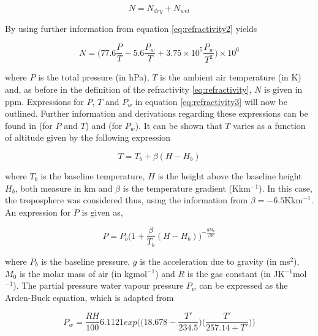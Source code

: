 \documentclass{article}
\begin{document}
\begin{equation}
N = N_{dry} + N_{wet}
\label{eq:refractivity2}
\end{equation}

\vspace{2mm}
\noindent
By using further information from \cite{Paper02} equation \eqref{eq:refractivity2} yields

\begin{equation}
N = \bigg(77.6\frac{P}{T} - 5.6\frac{P_w}{T} + 3.75 \times 10^5\frac{P_w}{T^2} \bigg) \times 10^6
\label{eq:refractivity3}
\end{equation}

\vspace{2mm}
\noindent
where $P$ is the total pressure (in hPa), $T$ is the ambient air temperature (in K) and, as before in the definition of the refractivity \eqref{eq:refractivity}, $N$ is given in ppm. Expressions for $P$, $T$ and $P_w$ in equation \eqref{eq:refractivity3} will now be outlined. Further information and derivations regarding these expressions can be found in \cite{Paper03} (for $P$ and $T$) and \cite{Paper04} (for $P_w$). It can be shown that $T$ varies as a function of altitude given by the following expression

\begin{equation}
T = T_b + \beta(H - H_b)
\label{eq:temperature}
\end{equation}

\vspace{2mm}
\noindent
where $T_b$ is the baseline temperature, $H$ is the height above the baseline height $H_b$, both measure in km and $\beta$ is the temperature gradient (Kkm$^{-1}$). In this case, the troposphere was considered thus, using the information from \cite{Paper03} $\beta = - 6.5$Kkm$^{-1}$. An expression for $P$ is given as,

\begin{equation}
P = P_b \bigg( 1 + \frac{\beta}{T_b}(H - H_b) \bigg) ^{-\frac{gM_0}{\beta R}}
\label{eq:pressure}
\end{equation}

\vspace{2mm}
\noindent
where $P_b$ is the baseline pressure, $g$ is the acceleration due to gravity (in ms$^2$), $M_0$ is the molar mass of air (in kgmol$^{-1}$) and $R$ is the gas constant (in JK$^{-1}$mol$^{-1}$). The partial pressure water vapour pressure $P_w$ can be expressed as the Arden-Buck equation, which is adapted from \cite{Paper04}

\begin{equation}
P_w = \frac{RH}{100} 6.1121exp \bigg( \bigg(18.678 - \frac{T'}{234.5} \bigg) \bigg (\frac{T'}{257.14 + T'} \bigg) \bigg)
\label{eq:Arden-Buck}
\end{equation}
\end{document}
